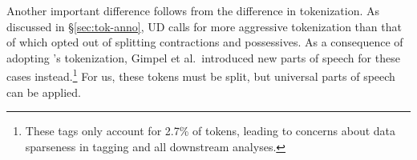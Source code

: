 \documentclass[11pt,a4paper]{article}
\begin{document}
Another important difference follows from the difference in
tokenization.  As discussed in \S\ref{sec:tok-anno}, UD calls for more
aggressive tokenization than that of \citet{ICWSM101540} which opted
out of splitting contractions and possessives. As a consequence of adopting \citet{ICWSM101540}'s tokenization, 
Gimpel et al.~introduced new parts of speech for these cases
instead.\footnote{These tags only account for 2.7\% of tokens,
  leading to concerns about data sparseness in tagging and all
  downstream analyses.}  For us, these tokens must be split, but
universal parts of speech can be applied.

\end{document}
